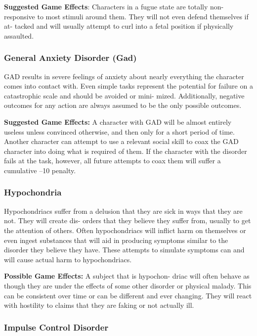 \textbf{Suggested Game Effects}: Characters in a fugue state 
are totally non-responsive to most stimuli around 
them. They will not even defend themselves if at-
tacked and will usually attempt to curl into a fetal 
position if physically assaulted.

\subsubsection{General Anxiety Disorder (Gad)}

GAD results in severe feelings of anxiety about nearly 
everything the character comes into contact with. 
Even simple tasks represent the potential for failure 
on a catastrophic scale and should be avoided or mini-
mized. Additionally, negative outcomes for any action 
are always assumed to be the only possible outcomes.

\textbf{Suggested Game Effects: }A character with GAD will 
be almost entirely useless unless convinced otherwise, 
and then only for a short period of time. Another 
character can attempt to use a relevant social skill to 
coax the GAD character into doing what is required 
of them. If the character with the disorder fails at the 
task, however, all future attempts to coax them will 
suffer a cumulative –10 penalty.

\subsubsection{Hypochondria}

Hypochondriacs suffer from a delusion that they are 
sick in ways that they are not. They will create dis-
orders that they believe they suffer from, usually to 
get the attention of others. Often hypochondriacs will 
inflict harm on themselves or even ingest substances 
that will aid in producing symptoms similar to the 
disorder they believe they have. These attempts to 
simulate symptoms can and will cause actual harm to 
hypochondriacs.

\textbf{Possible Game Effects: }A subject that is hypochon-
driac will often behave as though they are under the 
effects of some other disorder or physical malady. 
This can be consistent over time or can be different 
and ever changing. They will react with hostility to 
claims that they are faking or not actually ill.

\subsubsection{Impulse Control Disorder}

